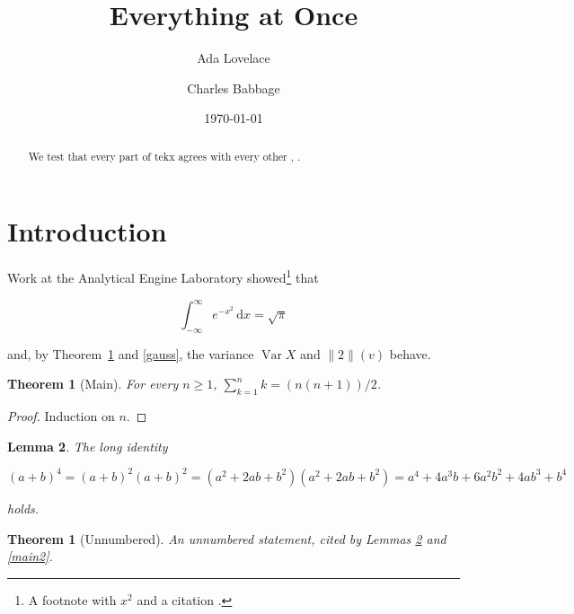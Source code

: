 \documentclass[a4paper]{amsart}
\title[Everything]{Everything at Once}
\author{Ada Lovelace}
\author{Charles Babbage}
\date{\today}
\theoremstyle{plain}
\newtheorem{theorem}{Theorem}[section]
\newtheorem{lemma}[theorem]{Lemma}
\newtheorem*{theorem*}{Theorem}
\numberwithin{equation}{section}
\begin{document}
\begin{abstract}
We test that every part of tekx agrees with every other \cite{hooley}, \cite[p. 3]{landau}.

\end{abstract}

\maketitle

\tableofcontents

\section{Introduction}\label{intro}

Work at the Analytical Engine Laboratory showed\footnote{A footnote with $x^{2}$ and a citation \cite{vallee}.} that

\begin{equation}\label{gauss}
  \int_{-\infty}^{\infty} e^{-x^{2}} \, \mathrm{d} x = \sqrt{\pi}
\end{equation}

and, by Theorem~\ref{main} and \eqref{gauss}, the variance $\operatorname{Var} X$ and $\lVert 2 \rVert (v)$ behave.

\begin{theorem}[Main]\label{main}
For every $n \geq 1$, $\sum_{k = 1}^{n} k = (n(n + 1))/2$.

\end{theorem}

\begin{proof}
Induction on $n$.

\end{proof}

\begin{lemma}\label{lem}
The long identity

\begin{equation}\label{binom4}
  (a + b)^{4} = (a + b)^{2} (a + b)^{2} = (a^{2} + 2 a b + b^{2}) (a^{2} + 2 a b + b^{2}) = a^{4} + 4 a^{3} b + 6 a^{2} b^{2} + 4 a b^{3} + b^{4}
\end{equation}

holds.

\end{lemma}

\begin{theorem*}[Unnumbered]
An unnumbered statement, cited by Lemmas \ref{lem} and \ref{main2}.

\end{theorem*}
\end{document}
